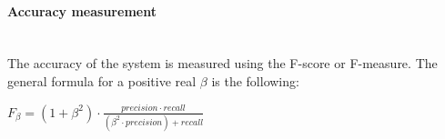 \begin{itemize}




		\paragraph{Accuracy measurement}\mbox{}\\


		The accuracy of the system is measured using the F-score or F-measure. 
		The general formula for a positive real $\beta$ is the following: 
		\\
		\begin{center}
		$F_\beta=(1+\beta^2)\cdot\frac{precision \cdot recall}{(\beta^2 \cdot precision )+recall}$
		\end{center}
		\\



		


\end{itemize}
